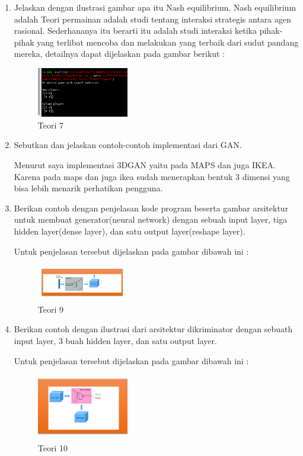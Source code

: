 \begin{enumerate}
	\item Jelaskan dengan ilustrasi gambar apa itu Nash equilibrium.
	\hfill\break
	Nash equilibrium adalah Teori permainan adalah studi tentang interaksi strategis antara agen rasional. Sederhananya itu berarti itu adalah studi interaksi ketika pihak-pihak yang terlibat mencoba dan melakukan yang terbaik dari sudut pandang mereka, detailnya dapat dijelaskan pada gambar berikut : 

	\begin{figure}[H]
	\centering
		\includegraphics[width=4cm]{figures/1174017/tugas8/materi/teori7.PNG}
		\caption{Teori 7}
	\end{figure}

	\item Sebutkan dan jelaskan contoh-contoh implementasi dari GAN.

	\hfill\break
	Menurut saya implementasi 3DGAN yaitu pada MAPS dan juga IKEA. Karena pada maps dan juga ikea sudah menerapkan bentuk 3 dimensi yang bisa lebih menarik perhatikan pengguna.

	\item Berikan contoh dengan penjelasan kode program beserta gambar arsitektur untuk membuat generator(neural network) dengan sebuah input layer, tiga hidden layer(dense layer), dan satu output layer(reshape layer).
	\hfill\break

	Untuk penjelasan tersebut dijelaskan pada gambar dibawah ini :

	\begin{figure}[H]
	\centering
		\includegraphics[width=4cm]{figures/1174017/tugas8/materi/teori9.PNG}
		\caption{Teori 9}
	\end{figure}

	\item Berikan contoh dengan ilustrasi dari arsitektur dikriminator dengan sebuath input layer, 3 buah hidden layer, dan satu output layer.
	\hfill\break

	Untuk penjelasan tersebut dijelaskan pada gambar dibawah ini :

	\begin{figure}[H]
	\centering
		\includegraphics[width=4cm]{figures/1174017/tugas8/materi/teori10.PNG}
		\caption{Teori 10}
	\end{figure}


\end{enumerate}
